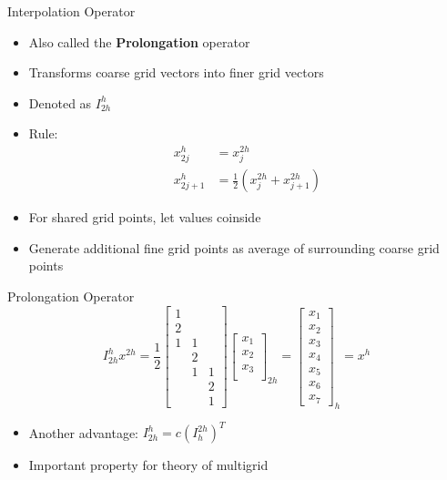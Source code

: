 \documentclass[11pt]{beamer}
\begin{document}
\begin{frame}{Interpolation Operator}
  \begin{itemize}
  \item Also called the \textbf{Prolongation} operator
  \item Transforms coarse grid vectors into finer grid vectors
  \item Denoted as \(I_{2h}^h\)  
  \item Rule:\begin{align*}
               x_{2j}^h &= x_j^{2h} \\
               x_{2j+1}^h &= \frac{1}{2} \left( x_j^{2h} + x_{j+1}^{2h} \right)
             \end{align*}
  \item For shared grid points, let values coinside
  \item Generate additional fine grid points as average of
    surrounding coarse grid points
  \end{itemize}

\end{frame}
\begin{frame}{Prolongation Operator}
  \[
    I_{2h}^h x^{2h} = \frac{1}{2} 
    \begin{bmatrix}
      1 & & \\
      2 & & \\
      1 & 1 & \\
      & 2 & \\
      & 1 & 1 \\
      & & 2 \\
      & & 1
    \end{bmatrix}
    \begin{bmatrix}
      x_1 \\ x_2 \\ x_3 \\
    \end{bmatrix}_{2h}
    = \begin{bmatrix}
      x_1 \\ x_2 \\ x_3 \\ x_4 \\ x_5 \\ x_6 \\ x_7
    \end{bmatrix}_h = x^h
  \]
  \begin{itemize}
  \item Another advantage: \(I_{2h}^h = c(I_h^{2h})^T\)
  \item Important property for theory of multigrid
  \end{itemize}
\end{frame}
\end{document}
